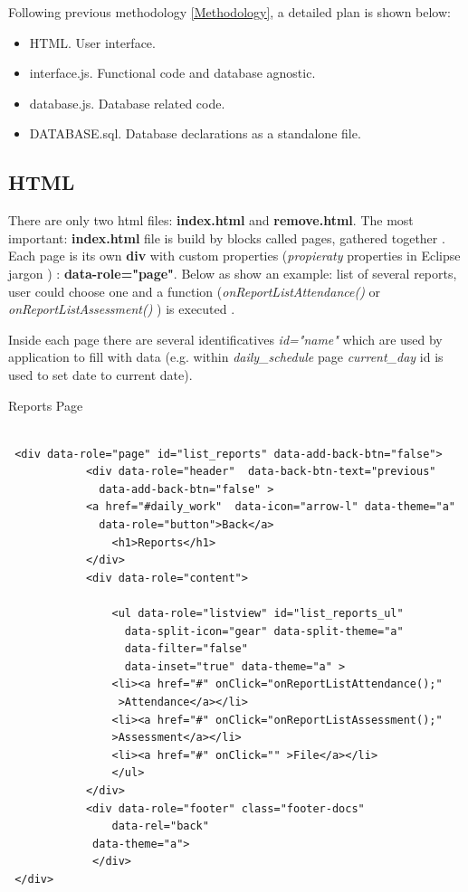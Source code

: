 Following previous methodology \ref{Methodology}, a detailed plan is shown below:
\begin{itemize}
    \item {HTML}. User interface. 
    \item {interface.js}. Functional code and database agnostic.
    \item {database.js}. Database related code.
    \item {DATABASE.sql}. Database declarations as a standalone file.
\end{itemize}
    
	\subsection{HTML}
  There are only two html files: \textbf{index.html} and \textbf{remove.html}. The most important: \textbf{index.html} file is build by
   blocks called pages, gathered together \cite{JQueryMobilePage}. Each page is its own {\bf div } 
   with custom properties (\emph{propieraty} properties in Eclipse jargon ) : {\bf data-role="page"}. Below as show an example: list of several reports, user could choose one and a function (\emph{onReportListAttendance() } or \emph{onReportListAssessment() }  ) is executed .
   
   
  Inside each page there are several identificatives \emph{id="name"} which are used by application to fill with data (e.g.
   within \emph{daily\_schedule} page \emph{current\_day} id is used to set date to current date). 
  
\begin{bclogo}[couleur=blue!30,arrondi=0.1,ombre=true ] 
{Reports Page}
\begin{verbatim}
  
 <div data-role="page" id="list_reports" data-add-back-btn="false">
            <div data-role="header"  data-back-btn-text="previous" 
              data-add-back-btn="false" >
            <a href="#daily_work"  data-icon="arrow-l" data-theme="a" 
              data-role="button">Back</a>
                <h1>Reports</h1>
            </div>
            <div data-role="content">

                <ul data-role="listview" id="list_reports_ul" 
                  data-split-icon="gear" data-split-theme="a" 
                  data-filter="false" 
                  data-inset="true" data-theme="a" >
                <li><a href="#" onClick="onReportListAttendance();"
                 >Attendance</a></li>
                <li><a href="#" onClick="onReportListAssessment();" 
                >Assessment</a></li>
                <li><a href="#" onClick="" >File</a></li>
                </ul>
            </div>
            <div data-role="footer" class="footer-docs" 
                data-rel="back"
             data-theme="a">
             </div>
 </div>
\end{verbatim}

\end{bclogo}

